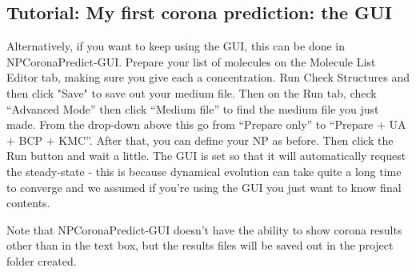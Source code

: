 \documentclass[10pt,a4paper,onecolumn]{report}
\begin{document}
\subsection{Tutorial: My first corona prediction: the GUI} \label{section:firstCoronaGUI}

Alternatively, if you want to keep using the GUI, this can be done in NPCoronaPredict-GUI. Prepare your list of molecules on the Molecule List Editor tab, making sure you give each a concentration. 
Run Check Structures and then click "Save" to save out your medium file.
 Then on the Run tab, check ``Advanced Mode'' then click ``Medium file'' to find the medium file you just made. 
From the drop-down above this go from ``Prepare only'' to ``Prepare + UA + BCP + KMC''. After that, you can define your NP as before. Then click the Run button and wait a little.
The GUI is set so that it will automatically request the steady-state - this is because dynamical evolution can take quite a long time to converge and we assumed if you're using the GUI you just want to know final contents.



Note that NPCoronaPredict-GUI doesn't have the ability to show corona results other than in the text box, but the results files will be saved out in the project folder created.
\end{document}
